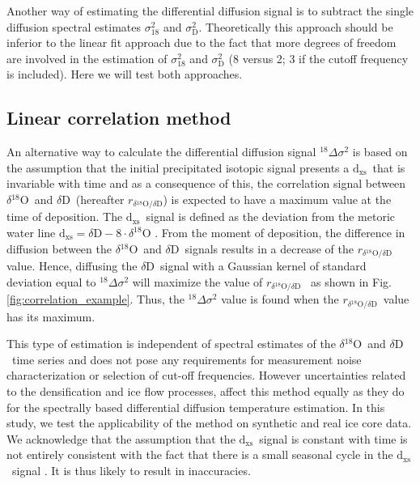 \documentclass[11pt, draftcls, onecolumn]{IEEEtran} %
\numberwithin{equation}{section}
\numberwithin{table}{section}
\numberwithin{figure}{section}
\newcommand{\delOx}{$\delta{}^{18}\mathrm{O}$}
\newcommand{\delD}{$\delta\mathrm{D}$}
\newcommand{\Dxs}{$\mathrm{d_{xs}}$}
\newcommand{\delcorrel}{$r_{\delta{}^{18}\mathrm{O}/\delta\mathrm{D}}$}
\begin{document}
Another  way of estimating the differential diffusion signal is to subtract the single diffusion 
spectral estimates $\sigma^2_{18}$ and $\sigma^2_{\mathrm{D}}$. 
Theoretically this approach should be inferior to the linear fit approach due to the fact that 
more degrees of freedom are involved in the estimation of $\sigma^2_{18}$ and 
$\sigma^2_{\mathrm{D}}$ (8 versus 2; 3 if the cutoff frequency is included).
Here we will test both approaches.



\subsection*{Linear correlation method}
An alternative way to calculate the differential diffusion signal ${}^{18}\Delta\sigma^2$
is based on the assumption that the initial precipitated isotopic signal presents a \Dxs~that
is invariable with time and as a consequence of this, the correlation signal between \delOx~and \delD~(hereafter \delcorrel) is expected
to have a maximum value at the time of deposition.
The \Dxs~signal is defined as the deviation from the metoric water line $\mathrm{d_{xs}}= \delta\mathrm{D}- 8\cdot\delta^{18}\mathrm{O} $ \citep{craig, Dansgaard}.
From the moment of deposition, the difference in diffusion between the \delOx~and \delD~signals results
in a decrease of the \delcorrel~ value. Hence, diffusing the \delD~signal 
with a Gaussian kernel of standard deviation equal to ${}^{18}\Delta\sigma^2$ will maximize 
the value of \delcorrel~\citep{vanderWel2015a} as shown in Fig. \ref{fig:correlation_example}.  
Thus, the ${}^{18}\Delta\sigma^2$ value is found when the \delcorrel~value has its maximum.

This type of estimation is independent of spectral estimates of the \delOx~and \delD~time series
and does not pose any requirements for measurement noise characterization or selection of
cut-off frequencies. However uncertainties related to the densification and ice flow processes, affect
this method equally as they do for the spectrally based differential diffusion temperature estimation. 
In this study, we test the applicability of the method on synthetic and real ice core data.
We acknowledge that the assumption that the \Dxs~signal is constant with time is 
not entirely consistent with the fact that there is a small seasonal cycle in the \Dxs~signal \citep{Johnsen1989}.
It is thus likely to result in inaccuracies.
\end{document}

